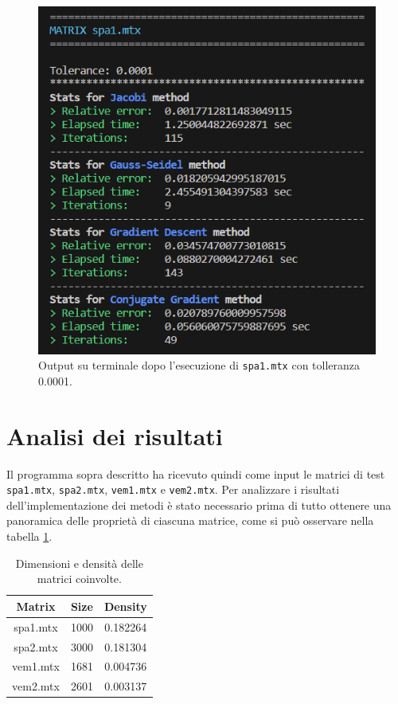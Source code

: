 \documentclass[12pt]{article}
\begin{document}
\begin{figure}[H]
    \begin{center}
    \includegraphics[scale=0.8]{images/output-cli.png}
    \caption{Output su terminale dopo l'esecuzione di \texttt{spa1.mtx} con tolleranza 0.0001.}
    \label{fig:cli-2}
    \end{center}
\end{figure}


\section{Analisi dei risultati}

Il programma sopra descritto ha ricevuto quindi come input le matrici di test \texttt{spa1.mtx}, \texttt{spa2.mtx}, \texttt{vem1.mtx} e \texttt{vem2.mtx}.
Per analizzare i risultati dell'implementazione dei metodi è stato necessario prima di tutto ottenere una panoramica delle proprietà di ciascuna matrice, come si può osservare nella tabella \ref{table:mat-stats}.

\begin{table}[!ht]
    \centering
    \begin{tabular}{ccc}
    \toprule
        \textbf{Matrix} & \textbf{Size} & \textbf{Density} \\ 
        \midrule
        spa1.mtx & 1000 & 0.182264 \\ 
        spa2.mtx & 3000 & 0.181304 \\ 
        vem1.mtx & 1681 & 0.004736 \\ 
        vem2.mtx & 2601 & 0.003137 \\ 
    \bottomrule
    \end{tabular}
    \caption{Dimensioni e densità delle matrici coinvolte.}
    \label{table:mat-stats}
\end{table}
\end{document}
